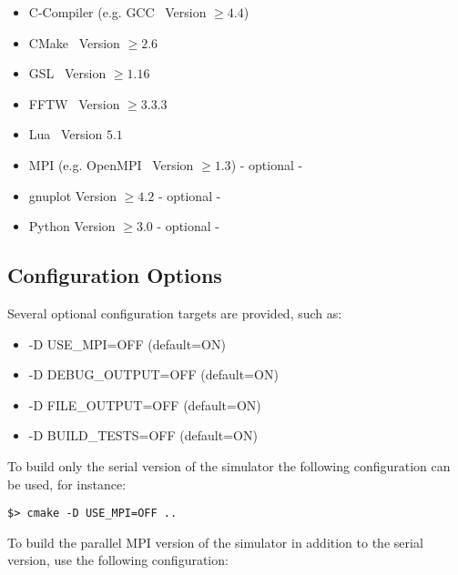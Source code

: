 \begin{itemize}
  \item C-Compiler (e.g. GCC~\cite{gcc} Version $\geq4.4$)
  \item CMake~\cite{cmake} Version $\geq2.6$
  \item GSL~\cite{gsl} Version $\geq1.16$
  \item FFTW~\cite{fftw} Version $\geq3.3.3$
  \item Lua~\cite{lua} Version $5.1$
  \item MPI (e.g. OpenMPI~\cite{openmpi} Version $\geq1.3$) - optional -
  \item gnuplot	\cite{gnuplot} Version $\geq4.2$ - optional -
  \item Python \cite{python} Version $\geq3.0$ - optional -
\end{itemize}


\subsection{Configuration Options}


Several optional configuration targets are provided, such as:

\begin{itemize}
  \item -D USE\_MPI=OFF (default=ON)
  \item -D DEBUG\_OUTPUT=OFF (default=ON)
  \item -D FILE\_OUTPUT=OFF (default=ON)
  \item -D BUILD\_TESTS=OFF (default=ON)
\end{itemize}

To build only the serial version of the simulator the following configuration can be used, for instance:

\begin{lstlisting}
$> cmake -D USE_MPI=OFF ..
\end{lstlisting}

To build the parallel MPI version of the simulator in addition to the serial version, use the following configuration:

